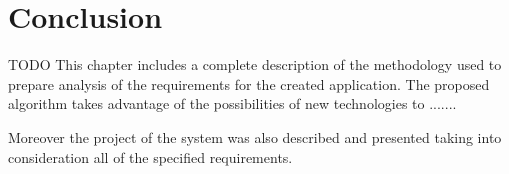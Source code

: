 \section{Conclusion}
TODO
This chapter includes a complete description of the methodology used to prepare analysis of the requirements for the created application. The proposed algorithm takes advantage of the possibilities of new technologies to .......

Moreover the project of the system was also described and presented taking into consideration all of the specified requirements.